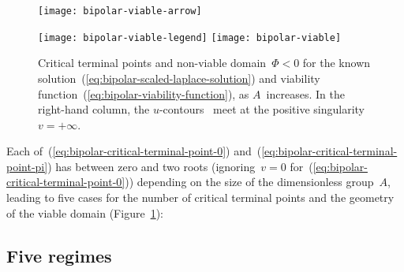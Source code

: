 \begin{figure}
  \centering
  \begin{minipage}[b]{0.1\textwidth}
    \texttt{[image: bipolar-viable-arrow]}
  \end{minipage}
  \begin{minipage}[b]{0.8\textwidth}
    \newcommand*{\legendtrimwidth}{0.03\textwidth}
    \newcommand*{\legendoffsetheight}{0.025\textwidth}
    \texttt{[image: bipolar-viable-legend]}
    \texttt{[image: bipolar-viable]}
  \end{minipage}
  \caption{
    Critical terminal points and non-viable domain~$\Phi < 0$
    for the known solution~(\ref{eq:bipolar-scaled-laplace-solution})
    and viability function~(\ref{eq:bipolar-viability-function}),
    as $A$~increases.
    In the right-hand column,
    the $u$-contours~ meet
    at the positive singularity~$v = +\infty$.
  }
  \label{fig:bipolar-viable}
\end{figure}

Each of~(\ref{eq:bipolar-critical-terminal-point-0})
and~(\ref{eq:bipolar-critical-terminal-point-pi})
has between zero and two roots
(ignoring~$v = 0$ for~(\ref{eq:bipolar-critical-terminal-point-0}))
depending on the size of the dimensionless group~$A$,
leading to five cases for the number of critical terminal points
and the geometry of the viable domain
(Figure~\ref{fig:bipolar-viable}):

\subsection{Five regimes}
\label{sec:bipolar.viable.regimes}

